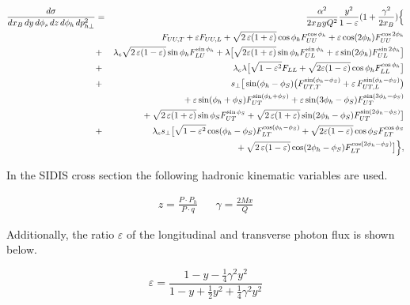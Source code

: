 \begin{eqnarray}
\frac{d\sigma}{dx_B \, dy\, d\phi_s \,dz\, d\phi_h\, d p_{h\perp}^2}
&=&\frac{\alpha^2}{2x_B y Q^2}
\frac{y^2}{1-\varepsilon}  ( 1+\frac{\gamma^2}{2x_B} ) \Bigl\{  \nonumber \\
&& F_{UU ,T} +  \varepsilon F_{UU ,L}
+ \sqrt{2\,\varepsilon (1+\varepsilon)} \cos\phi_h F_{UU}^{\cos\phi_h}
+ \varepsilon \cos(2\phi_h) F_{UU}^{\cos 2\phi_h} \nonumber \\
&+& \lambda_e
\sqrt{2\,\varepsilon (1-\varepsilon)} \sin\phi_h F_{LU}^{\sin\phi_h}
+ \lambda \big[ \sqrt{2 \varepsilon (1+\varepsilon)} \sin\phi_h F_{UL}^{\sin\phi_h}
  +  \varepsilon \sin(2\phi_h) F_{UL}^{\sin 2\phi_h} \big] \nonumber \\
&+&  \lambda_e \lambda
\big[\sqrt{1-\varepsilon^2} F_{LL}
  +\sqrt{2\varepsilon (1-\varepsilon)} \cos\phi_h F_{LL}^{\cos \phi_h}\big] \nonumber \\
&+& s_\perp
\big[ \sin(\phi_h-\phi_S) \bigl(F_{UT ,T}^{\sin(\phi_h -\phi_S)}
  + \varepsilon\, F_{UT ,L}^{\sin(\phi_h -\phi_S)}\bigr) \nonumber \\
  && \phantom{s_\perp}
  + \varepsilon \sin(\phi_h+\phi_S) F_{UT}^{\sin(\phi_h +\phi_S)}
  + \varepsilon \sin(3\phi_h-\phi_S) F_{UT}^{\sin(3\phi_h -\phi_S)} \nonumber \\
  && \phantom{s_\perp}
  + \sqrt{2\,\varepsilon (1+\varepsilon)} \sin\phi_S F_{UT}^{\sin \phi_S }
  + \sqrt{2\,\varepsilon (1+\varepsilon)} \sin(2\phi_h-\phi_S) F_{UT}^{\sin(2\phi_h -\phi_S)}\big]\nonumber \\
&+& \lambda_e s_\perp
\big[\sqrt{1-\varepsilon^2} \cos(\phi_h-\phi_S) F_{LT}^{\cos(\phi_h -\phi_S)}
  +\sqrt{2\varepsilon (1-\varepsilon)} \cos\phi_S F_{LT}^{\cos \phi_S} \nonumber \\
  && \phantom{\lambda_e s_\perp}
  +\sqrt{2\,\varepsilon (1-\varepsilon)} \cos(2\phi_h-\phi_S) F_{LT}^{\cos(2\phi_h - \phi_S)} \big] \Bigr\},
\label{e:crossmaster}
\end{eqnarray}

In the SIDIS cross section the following hadronic kinematic variables are used. 

\begin{align}
  z = \frac{P \cdot P_{h}}{P \cdot q} && \gamma = \frac{2Mx}{Q}
\end{align}

Additionally, the ratio $\varepsilon$ of the longitudinal and transverse photon flux is shown below.

\begin{equation}
	\varepsilon = \frac{1 - y - \frac{1}{4}\gamma^2 y^2}{1 - y + \frac{1}{2}y^2 + \frac{1}{4}\gamma^2 y^2}
\end{equation}

